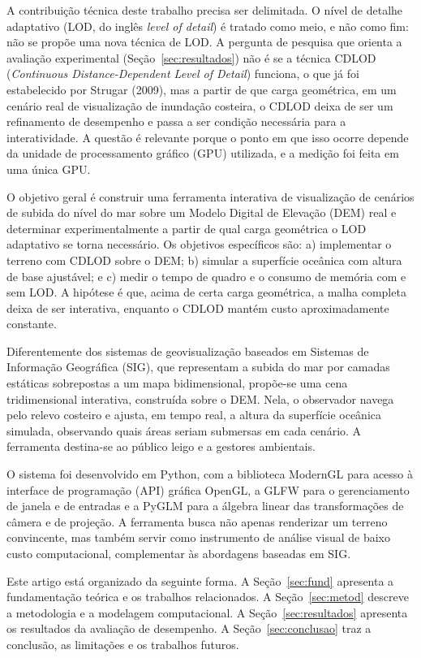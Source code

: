 \documentclass[conference]{IEEEtran}
\begin{document}
A contribuição técnica deste trabalho precisa ser delimitada. O nível de
detalhe adaptativo (LOD, do inglês \emph{level of detail}) é tratado como
meio, e não como fim: não se propõe uma nova técnica de LOD. A pergunta de
pesquisa que orienta a avaliação experimental (Seção~\ref{sec:resultados})
não é se a técnica CDLOD (\emph{Continuous Distance-Dependent Level of
Detail}) funciona, o que já foi estabelecido por Strugar (2009),
mas a partir de que carga geométrica, em um cenário real de visualização
de inundação costeira, o CDLOD deixa de ser um refinamento de desempenho e
passa a ser condição necessária para a interatividade. A questão é relevante porque o ponto em que isso ocorre depende da unidade de processamento gráfico (GPU) utilizada, e a medição foi feita em uma única GPU.

O objetivo geral é construir uma ferramenta interativa de visualização de
cenários de subida do nível do mar sobre um Modelo Digital de Elevação
(DEM) real e determinar experimentalmente a partir de qual carga geométrica
o LOD adaptativo se torna necessário. Os objetivos específicos são: a)
implementar o terreno com CDLOD sobre o DEM; b) simular a superfície
oceânica com altura de base ajustável; e c) medir o tempo de quadro e o
consumo de memória com e sem LOD. A hipótese é que, acima de certa carga
geométrica, a malha completa deixa de ser interativa, enquanto o CDLOD
mantém custo aproximadamente constante.

Diferentemente dos sistemas de geovisualização baseados em Sistemas de
Informação Geográfica (SIG), que representam a subida do mar por camadas
estáticas sobrepostas a um mapa bidimensional, propõe-se uma cena
tridimensional interativa, construída sobre o DEM. Nela, o
observador navega pelo relevo costeiro e ajusta, em tempo real, a altura
da superfície oceânica simulada, observando quais áreas seriam submersas
em cada cenário. A ferramenta destina-se ao público leigo e a gestores
ambientais.

O sistema foi desenvolvido em Python, com a biblioteca ModernGL para
acesso à interface de programação (API) gráfica OpenGL, a GLFW para o gerenciamento de janela e de
entradas e a PyGLM para a álgebra linear das transformações de câmera e
de projeção. A ferramenta busca não apenas renderizar um terreno
convincente, mas também servir como instrumento de análise visual de
baixo custo computacional, complementar às abordagens baseadas em SIG.

Este artigo está organizado da seguinte forma. A
Seção~\ref{sec:fund} apresenta a fundamentação teórica e os trabalhos
relacionados. A Seção~\ref{sec:metod} descreve a metodologia e a
modelagem computacional. A Seção~\ref{sec:resultados} apresenta os
resultados da avaliação de desempenho. A Seção~\ref{sec:conclusao}
traz a conclusão, as limitações e os trabalhos futuros.
\end{document}
